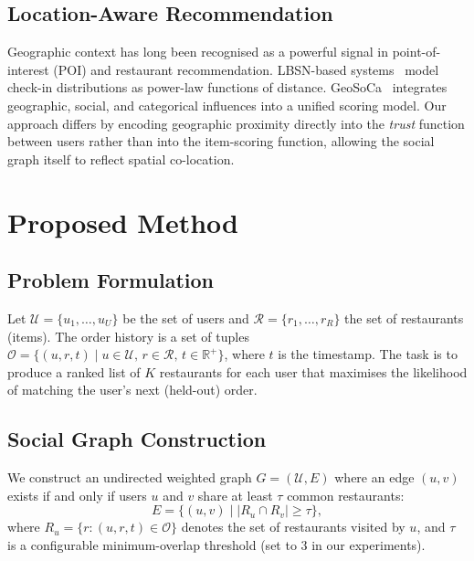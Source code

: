 \documentclass[conference]{IEEEtran}
\begin{document}
\subsection{Location-Aware Recommendation}
Geographic context has long been recognised as a powerful signal in
point-of-interest (POI) and restaurant recommendation.  LBSN-based
systems~\cite{ye2011exploiting} model check-in distributions as
power-law functions of distance.  GeoSoCa~\cite{zhang2015geosoca}
integrates geographic, social, and categorical influences into a unified
scoring model.  Our approach differs by encoding geographic proximity
directly into the \emph{trust} function between users rather than into
the item-scoring function, allowing the social graph itself to reflect
spatial co-location.


\section{Proposed Method}
\label{sec:method}

\subsection{Problem Formulation}
Let $\mathcal{U} = \{u_1, \ldots, u_U\}$ be the set of users and
$\mathcal{R} = \{r_1, \ldots, r_R\}$ the set of restaurants (items).
The order history is a set of tuples
$\mathcal{O} = \{(u, r, t) \mid u \in \mathcal{U},\, r \in \mathcal{R},\, t \in \mathbb{R}^+\}$,
where $t$ is the timestamp.  The task is to produce a ranked list of $K$
restaurants for each user that maximises the likelihood of matching the
user's next (held-out) order.

\subsection{Social Graph Construction}
\label{sec:graph}
We construct an undirected weighted graph $G = (\mathcal{U}, E)$ where
an edge $(u, v)$ exists if and only if users $u$ and $v$ share at least
$\tau$ common restaurants:
\begin{equation}
  E = \bigl\{(u,v) \;\big|\; |R_u \cap R_v| \geq \tau \bigr\},
  \label{eq:edge_threshold}
\end{equation}
where $R_u = \{r : (u,r,t) \in \mathcal{O}\}$ denotes the set of
restaurants visited by $u$, and $\tau$ is a configurable minimum-overlap
threshold (set to 3 in our experiments).
\end{document}

